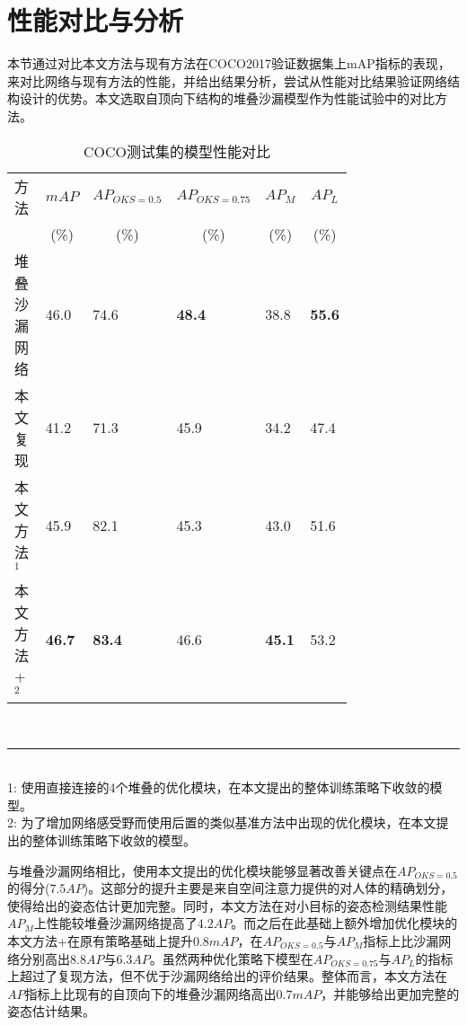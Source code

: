 \section{性能对比与分析}
\label{sec:perfcompare}
本节通过对比本文方法与现有方法在COCO2017验证数据集上mAP指标的表现，来对比网络与现有方法的性能，并给出结果分析，尝试从性能对比结果验证网络结构设计的优势。本文选取自顶向下结构的堆叠沙漏模型作为性能试验中的对比方法。
\begin{table*}[ht]
	\centering
	\caption{COCO测试集的模型性能对比}
	\label{tab:mAPCOCObenchmark}
	\begin{minipage}[t]{0.8\linewidth}
		\begin{tabular}{p{0.25\linewidth}p{0.1\linewidth}<{\centering}p{0.1\linewidth}<{\centering}p{0.1\linewidth}<{\centering}p{0.1\linewidth}<{\centering}p{0.1\linewidth}<{\centering}}
			\hline
			方法 & \multicolumn{1}{c}{$mAP$} & \multicolumn{1}{c}{$AP_{OKS=0.5}$} & \multicolumn{1}{c}{$AP_{OKS=0.75}$}
			& \multicolumn{1}{c}{$AP_M$} & \multicolumn{1}{c}{$AP_L$} \\
			
			& \multicolumn{1}{c}{(\%)}& \multicolumn{1}{c}{(\%)}&
			\multicolumn{1}{c}{(\%)}& \multicolumn{1}{c}{(\%)}& \multicolumn{1}{c}{
				(\%)}\\
			\hline
			堆叠沙漏网络\cite{newell2016stacked} & 46.0 & 74.6 & \textbf{48.4} & 38.8  & \textbf{55.6} \\
			本文复现 & 41.2 & 71.3 & 45.9 & 34.2 & 47.4 \\
			本文方法$^1$ & 45.9 & 82.1 & 45.3 & 43.0 & 51.6 \\
			本文方法+ $^2$ & \textbf{46.7} & \textbf{83.4} & 46.6 & \textbf{45.1} & 53.2 \\
			\hline
		\end{tabular}\\[2pt]
		\noindent\rule{0.25\linewidth}{1pt} \\
		\footnotesize
		1: 使用直接连接的4个堆叠的优化模块，在本文提出的整体训练策略下收敛的模型。\\
		2: 为了增加网络感受野而使用后置的类似基准方法中出现的优化模块，在本文提出的整体训练策略下收敛的模型。
	\end{minipage}
\end{table*}

与堆叠沙漏网络相比，使用本文提出的优化模块能够显著改善关键点在$AP_{OKS=0.5}$的得分($7.5AP$)。这部分的提升主要是来自空间注意力提供的对人体的精确划分，使得给出的姿态估计更加完整。同时，本文方法在对小目标的姿态检测结果性能$AP_M$上性能较堆叠沙漏网络提高了$4.2AP$。而之后在此基础上额外增加优化模块的本文方法+在原有策略基础上提升$0.8mAP$，在$AP_{OKS=0.5}$与$AP_M$指标上比沙漏网络分别高出$8.8AP$与$6.3AP$。虽然两种优化策略下模型在$AP_{OKS=0.75}$与$AP_L$的指标上超过了复现方法，但不优于沙漏网络给出的评价结果。整体而言，本文方法在$AP$指标上比现有的自顶向下的堆叠沙漏网络高出$0.7mAP$，并能够给出更加完整的姿态估计结果。


